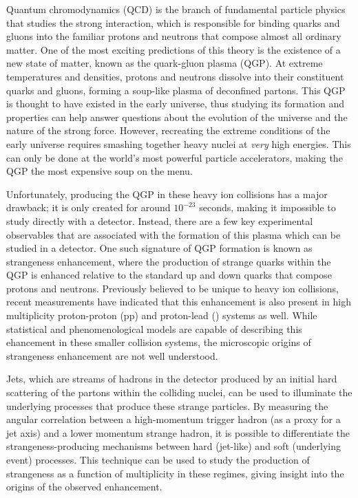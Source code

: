 Quantum chromodynamics (QCD) is the branch of fundamental particle physics that studies the strong interaction, which is responsible for binding quarks and gluons into the familiar protons and neutrons that compose almost all ordinary matter. One of the most exciting predictions of this theory is the existence of a new state of matter, known as the quark-gluon plasma (QGP). At extreme temperatures and densities, protons and neutrons dissolve into their constituent quarks and gluons, forming a soup-like plasma of deconfined partons. This QGP is thought to have existed in the early universe, thus studying its formation and properties can help answer questions about the evolution of the universe and the nature of the strong force. However, recreating the extreme conditions of the early universe requires smashing together heavy nuclei at \textit{very} high energies. This can only be done at the world's most powerful particle accelerators, making the QGP the most expensive soup on the menu.

Unfortunately, producing the QGP in these heavy ion collisions has a major drawback; it is only created for around $10^{-23}$ seconds, making it impossible to study directly with a detector. Instead, there are a few key experimental observables that are associated with the formation of this plasma which can be studied in a detector. One such signature of QGP formation is known as strangeness enhancement, where the production of strange quarks within the QGP is enhanced relative to the standard up and down quarks that compose protons and neutrons. Previously believed to be unique to heavy ion collisions, recent measurements have indicated that this enhancement is also present in high multiplicity proton-proton (pp) and proton-lead (\pPb) systems as well. While statistical and phenomenological models are capable of describing this ehancement in these smaller collision systems, the microscopic origins of strangeness enhancement are not well understood.

Jets, which are streams of hadrons in the detector produced by an initial hard scattering of the partons within the colliding nuclei, can be used to illuminate the underlying processes that produce these strange particles. By measuring the angular correlation between a high-momentum trigger hadron (as a proxy for a jet axis) and a lower momentum strange hadron, it is possible to differentiate the strangeness-producing mechanisms between hard (jet-like) and soft (underlying event) processes. This technique can be used to study the production of strangeness as a function of multiplicity in these regimes, giving insight into the origins of the observed enhancement. 

